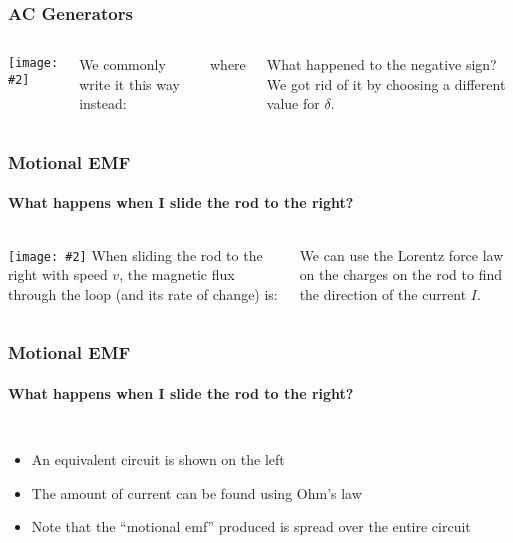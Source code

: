 \documentclass[12pt,aspectratio=169]{beamer}
\newcommand{\pic}[2]{\texttt{[image: \#2]}}
\newcommand{\eq}[2]{\vspace{#1}{\Large\begin{displaymath}#2\end{displaymath}}}
\begin{document}
\begin{frame}
  \frametitle{AC Generators}
  \begin{columns}
    \pic{1}{generator.png}

    We commonly write it this way instead:
    
    \eq{-.25in}{\mathcal{E}=\mathcal{E}_{\textrm{max}}\sin(\omega t+\delta)}
    
    \vspace{-.2in}where

    \eq{-.25in}{\mathcal{E}_{\textrm{max}}=NBA\omega}

    What happened to the negative sign? We got rid of it by choosing a
    different value for $\delta$.
  \end{columns}
\end{frame}


\begin{frame}
  \frametitle{Motional EMF}
  \framesubtitle{What happens when I slide the rod to the right?}
  \begin{columns}
    \pic{1}{motional-emf-1.jpg}
    When sliding the rod to the right with speed $v$, the magnetic flux through
    the loop (and its rate of change) is:

    
    We can use the Lorentz force law on the charges on the rod to find the
    direction of the current $I$.
  \end{columns}
\end{frame}

\begin{frame}
  \frametitle{Motional EMF}
  \framesubtitle{What happens when I slide the rod to the right?}
  \begin{columns}
    \begin{itemize}
    \item An equivalent circuit is shown on the left
    \item The amount of current can be found using Ohm's law
    \item Note that the ``motional emf'' produced is spread over the entire
      circuit
    \end{itemize}
  \end{columns}
\end{frame}
\end{document}
